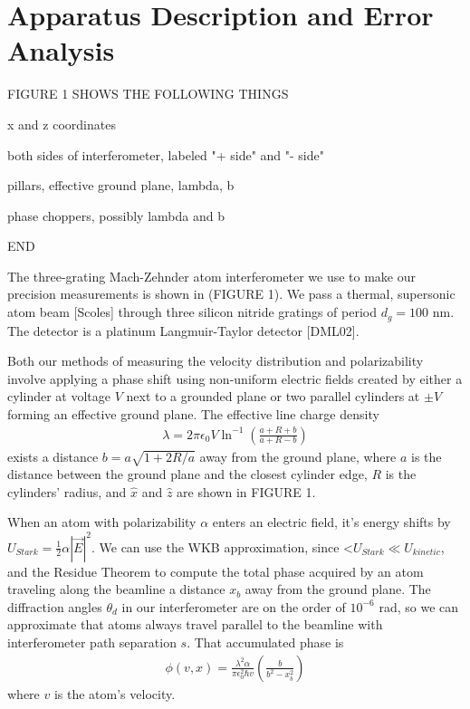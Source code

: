 \documentclass[twocolumn, prl,showpacs,superscriptaddress]{revtex4-1}   %
\newcommand{\abs}[1]{\left|#1\right|}
\begin{document}
\section{Apparatus Description and Error Analysis}

FIGURE 1 SHOWS THE FOLLOWING THINGS

x and z coordinates

both sides of interferometer, labeled "+ side" and "- side"

pillars, effective ground plane, lambda, b

phase choppers, possibly lambda and b

END


The three-grating Mach-Zehnder atom interferometer we use to make our precision measurements is shown in (FIGURE 1). We pass a thermal, supersonic atom beam [Scoles] through three silicon nitride gratings of period $d_g = 100$ nm. The detector is a platinum Langmuir-Taylor detector [DML02].

Both our methods of measuring the velocity distribution and polarizability involve applying a phase shift using non-uniform electric fields created by either a cylinder at voltage $V$ next to a grounded plane or two parallel cylinders at $\pm V$ forming an effective ground plane. The effective line charge density
\begin{align}
	\lambda = 2\pi\epsilon_0V\ln^{-1}
	\left(
		\frac{a+R+b}{a+R-b}
	\right)
	\label{lambda}
\end{align}
exists a distance $b = a\sqrt{1+2R/a}$ away from the ground plane, where $a$ is the distance between the ground plane and the closest cylinder edge, $R$ is the cylinders' radius, and $\hat{x}$ and $\hat{z}$ are shown in FIGURE 1.

When an atom with polarizability $\alpha$ enters an electric field, it's energy shifts by $U_{Stark} = \frac{1}{2}\alpha\abs{\vec{E}}^2$. We can use the WKB approximation, since <$U_{Stark} \ll U_{kinetic}$, and the Residue Theorem to compute the total phase acquired by an atom traveling along the beamline a distance $x_b$ away from the ground plane.
The diffraction angles $\theta_d$ in our interferometer are on the order of $10^{-6}$ rad, so we can approximate that atoms always travel parallel to the beamline with interferometer path separation $s$. That accumulated phase is
\begin{align}
	\phi(v,x) = \frac{\lambda^2 \alpha}{\pi \epsilon_0^2 \hbar v}
	\left( \frac{b}{b^2-x_b^2} \right)
	\label{accumPhasePillars}
\end{align}
where $v$ is the atom's velocity.
\end{document}
